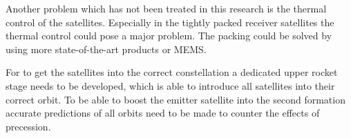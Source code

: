 Another problem which has not been treated in this research is the thermal control of the satellites. Especially in the tightly packed receiver satellites the thermal control could pose a major problem. The packing could be solved by using more state-of-the-art products or \ac{MEMS}.

For to get the satellites into the correct constellation a dedicated upper rocket stage needs to be developed, which is able to introduce all satellites into their correct orbit. To be able to boost the emitter satellite into the second formation accurate predictions of all orbits need to be made to counter the effects of precession.

